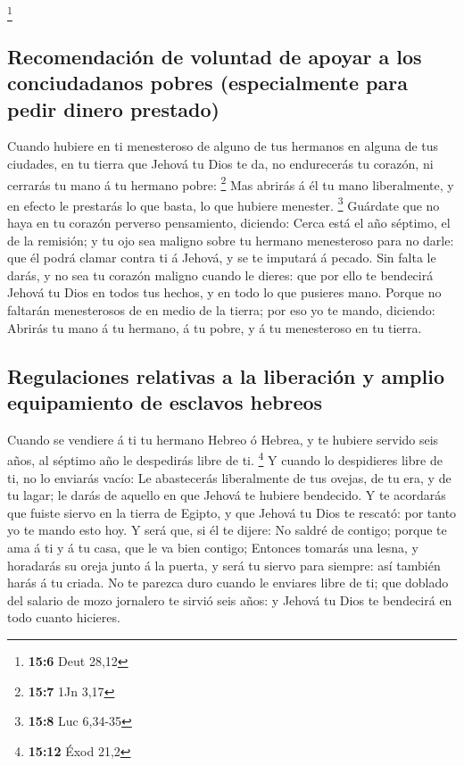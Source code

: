 \footnote{\textbf{15:6} Deut 28,12}

\hypertarget{recomendaciuxf3n-de-voluntad-de-apoyar-a-los-conciudadanos-pobres-especialmente-para-pedir-dinero-prestado}{%
\subsection{Recomendación de voluntad de apoyar a los conciudadanos
pobres (especialmente para pedir dinero
prestado)}\label{recomendaciuxf3n-de-voluntad-de-apoyar-a-los-conciudadanos-pobres-especialmente-para-pedir-dinero-prestado}}

 Cuando hubiere en ti menesteroso de alguno de tus
hermanos en alguna de tus ciudades, en tu tierra que Jehová tu Dios te
da, no endurecerás tu corazón, ni cerrarás tu mano á tu hermano pobre:
\footnote{\textbf{15:7} 1Jn 3,17}  Mas abrirás á él tu
mano liberalmente, y en efecto le prestarás lo que basta, lo que hubiere
menester. \footnote{\textbf{15:8} Luc 6,34-35}  Guárdate
que no haya en tu corazón perverso pensamiento, diciendo: Cerca está el
año séptimo, el de la remisión; y tu ojo sea maligno sobre tu hermano
menesteroso para no darle: que él podrá clamar contra ti á Jehová, y se
te imputará á pecado.  Sin falta le darás, y no sea tu
corazón maligno cuando le dieres: que por ello te bendecirá Jehová tu
Dios en todos tus hechos, y en todo lo que pusieres mano.
 Porque no faltarán menesterosos de en medio de la
tierra; por eso yo te mando, diciendo: Abrirás tu mano á tu hermano, á
tu pobre, y á tu menesteroso en tu tierra.

\hypertarget{regulaciones-relativas-a-la-liberaciuxf3n-y-amplio-equipamiento-de-esclavos-hebreos}{%
\subsection{Regulaciones relativas a la liberación y amplio equipamiento
de esclavos
hebreos}\label{regulaciones-relativas-a-la-liberaciuxf3n-y-amplio-equipamiento-de-esclavos-hebreos}}

 Cuando se vendiere á ti tu hermano Hebreo ó Hebrea, y te
hubiere servido seis años, al séptimo año le despedirás libre de ti.
\footnote{\textbf{15:12} Éxod 21,2}  Y cuando lo
despidieres libre de ti, no lo enviarás vacío:  Le
abastecerás liberalmente de tus ovejas, de tu era, y de tu lagar; le
darás de aquello en que Jehová te hubiere bendecido.  Y
te acordarás que fuiste siervo en la tierra de Egipto, y que Jehová tu
Dios te rescató: por tanto yo te mando esto hoy.  Y será
que, si él te dijere: No saldré de contigo; porque te ama á ti y á tu
casa, que le va bien contigo;  Entonces tomarás una
lesna, y horadarás su oreja junto á la puerta, y será tu siervo para
siempre: así también harás á tu criada.  No te parezca
duro cuando le enviares libre de ti; que doblado del salario de mozo
jornalero te sirvió seis años: y Jehová tu Dios te bendecirá en todo
cuanto hicieres.

